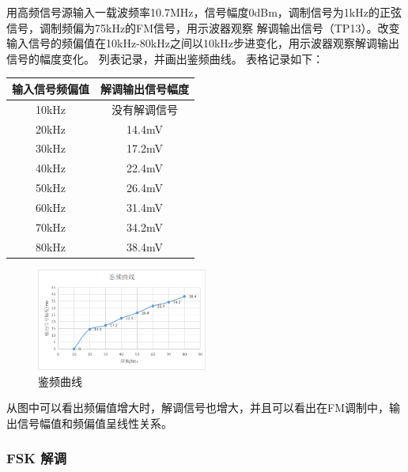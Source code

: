 \documentclass{../source/Experiment}
\begin{document}
            用高频信号源输入一载波频率10.7MHz，信号幅度0dBm，调制信号为1kHz的正弦信号，调制频偏为75kHz的FM信号，用示波器观察
            解调输出信号（TP13）。改变输入信号的频偏值在10kHz-80kHz之间以10kHz步进变化，用示波器观察解调输出信号的幅度变化。
            列表记录，并画出鉴频曲线。
            表格记录如下：
            \begin{table}[H]
                \centering
                \begin{tabular}{|c|c|}
                \hline
                输入信号频偏值 & 解调输出信号幅度 \\ \hline
                10kHz   & 没有解调信号   \\ \hline
                20kHz   & 14.4mV   \\ \hline
                30kHz   & 17.2mV   \\ \hline
                40kHz   & 22.4mV   \\ \hline
                50kHz   & 26.4mV   \\ \hline
                60kHz   & 31.4mV   \\ \hline
                70kHz   & 34.2mV   \\ \hline
                80kHz   & 38.4mV   \\ \hline
                \end{tabular}
                \end{table}

                \begin{figure}[H]
                    \centering
                    \includegraphics[width = 0.5\textwidth]{lab4/图片1.png}
                    \caption{鉴频曲线}    
                \end{figure}
                
                从图中可以看出频偏值增大时，解调信号也增大，并且可以看出在FM调制中，输出信号幅值和频偏值呈线性关系。
            \subsubsection{FSK 解调}
            
\end{document}
